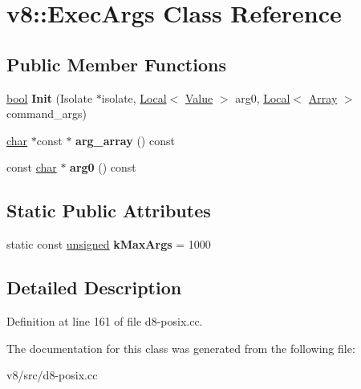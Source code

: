 \hypertarget{classv8_1_1ExecArgs}{}\section{v8\+:\+:Exec\+Args Class Reference}
\label{classv8_1_1ExecArgs}
\subsection*{Public Member Functions}
\begin{DoxyCompactItemize}
\item 
\mbox{\label{classv8_1_1ExecArgs_a0a3d2c5c83746343e23c35d0ac3c4b45}} 
\mbox{\hyperlink{classbool}{bool}} {\bfseries Init} (Isolate $\ast$isolate, \mbox{\hyperlink{classv8_1_1Local}{Local}}$<$ \mbox{\hyperlink{classv8_1_1Value}{Value}} $>$ arg0, \mbox{\hyperlink{classv8_1_1Local}{Local}}$<$ \mbox{\hyperlink{classv8_1_1Array}{Array}} $>$ command\+\_\+args)
\item 
\mbox{\label{classv8_1_1ExecArgs_ad4a799c6383f69d9e7a57994f531f551}} 
\mbox{\hyperlink{classchar}{char}} $\ast$const  $\ast$ {\bfseries arg\+\_\+array} () const
\item 
\mbox{\label{classv8_1_1ExecArgs_aff22a0c950390341ef18b71902336db2}} 
const \mbox{\hyperlink{classchar}{char}} $\ast$ {\bfseries arg0} () const
\end{DoxyCompactItemize}
\subsection*{Static Public Attributes}
\begin{DoxyCompactItemize}
\item 
\mbox{\label{classv8_1_1ExecArgs_acef444e061c4104eb8810fd0d5ae366d}} 
static const \mbox{\hyperlink{classunsigned}{unsigned}} {\bfseries k\+Max\+Args} = 1000
\end{DoxyCompactItemize}


\subsection{Detailed Description}


Definition at line 161 of file d8-\/posix.\+cc.



The documentation for this class was generated from the following file\+:\begin{DoxyCompactItemize}
\item 
v8/src/d8-\/posix.\+cc\end{DoxyCompactItemize}
